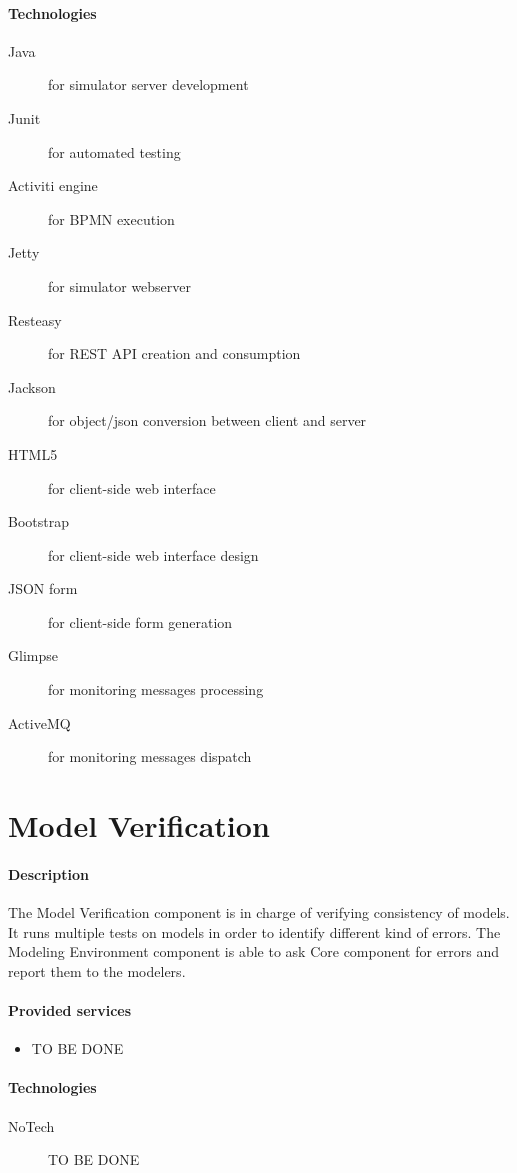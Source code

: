 \documentclass{learnpad}
\begin{document}
\paragraph{Technologies}
\begin{description}
	\item[Java] for simulator server development
	\item[Junit] for automated testing
	\item[Activiti engine] for BPMN execution
	\item[Jetty] for simulator webserver
	\item[Resteasy] for REST API creation and consumption
	\item[Jackson] for object/json conversion between client and server
	\item[HTML5] for client-side web interface
	\item[Bootstrap] for client-side web interface design
	\item[JSON form] for client-side form generation
	\item[Glimpse] for monitoring messages processing
	\item[ActiveMQ] for monitoring messages dispatch
\end{description}

\section{Model Verification}\label{sec:model-verification}
\paragraph{Description}
The Model Verification component is in charge of verifying consistency of
models.  It runs multiple tests on models in order to identify different kind of
errors.  The Modeling Environment component is able to ask \learnpad Core
component for errors and report them to the modelers.

\paragraph{Provided services}
\begin{itemize}
	\item TO BE DONE
\end{itemize}

\paragraph{Technologies}
\begin{description}
	\item[NoTech] TO BE DONE
\end{description}
\end{document}
